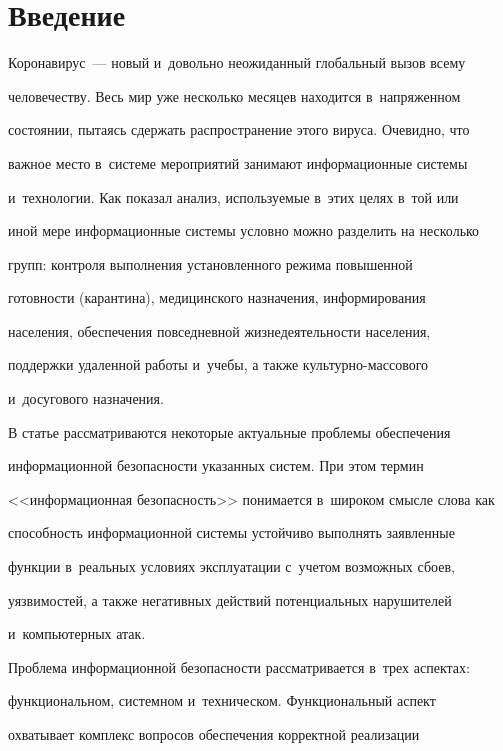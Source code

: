 \section{Введение}





  Коронавирус~--- новый и~довольно неожиданный глобальный вызов всему 


человечеству. Весь мир уже несколько месяцев находится в~напряженном 


состоянии, пытаясь сдержать распространение этого вируса. Очевидно, что 


важное место в~системе мероприятий занимают информационные системы 


и~технологии. Как показал анализ, используемые в~этих целях в~той или 


иной мере информационные системы условно можно разделить на несколько 


групп: контроля выполнения установленного режима повышенной 


готовности (карантина), медицинского назначения, информирования 


населения, обеспечения повседневной жизнедеятельности населения, 


поддержки удаленной работы и~учебы, а также куль\-тур\-но-мас\-со\-во\-го 


и~досугового назначения.


  


  В статье рассматриваются некоторые актуальные проблемы обеспечения 


информационной безопасности указанных систем. При этом термин 


<<информационная безопасность>> понимается в~широком смысле слова как 


способность информационной системы устойчиво выполнять заявленные 


функции в~реальных условиях эксплуатации с~учетом возможных сбоев, 


уязвимостей, а также негативных действий потенциальных нарушителей 


и~компьютерных атак. 


  


  Проблема информационной безопасности рассматривается в~трех аспектах: 


функциональном, системном и~техническом. Функциональный аспект 


охватывает комплекс вопросов обеспечения корректной реализации 



